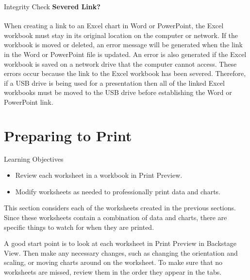 \begin{center}
	\begin{infobox}{Integrity Check}
		\textbf{Severed Link?}
		\\
		\\
		When creating a link to an Excel chart in Word or PowerPoint, the Excel workbook must stay in its original location on the computer or network. If the workbook is moved or deleted, an error message will be generated when the link in the Word or PowerPoint file is updated. An error is also generated if the Excel workbook is saved on a network drive that the computer cannot access. These errors occur because the link to the Excel workbook has been severed. Therefore, if a USB drive is being used for a presentation then all of the linked Excel workbooks must be moved to the USB drive before establishing the Word or PowerPoint link.
	\end{infobox}
\end{center}

\section{Preparing to Print}

\begin{center}
	\begin{objbox}{Learning Objectives}
		\begin{itemize}
			\setlength{\itemsep}{0pt}
			\setlength{\parskip}{0pt}
			\setlength{\parsep}{0pt}

			\item Review each worksheet in a workbook in Print Preview.
			\item Modify worksheets as needed to professionally print data and charts.
			
		\end{itemize}
	\end{objbox}
\end{center}

This section considers each of the worksheets created in the previous sections. Since these worksheets contain a combination of data and charts, there are specific things to watch for when they are printed.

A good start point is to look at each worksheet in Print Preview in Backstage View. Then make any necessary changes, such as changing the orientation and scaling, or moving charts around on the worksheet. To make sure that no worksheets are missed, review them in the order they appear in the tabs.

